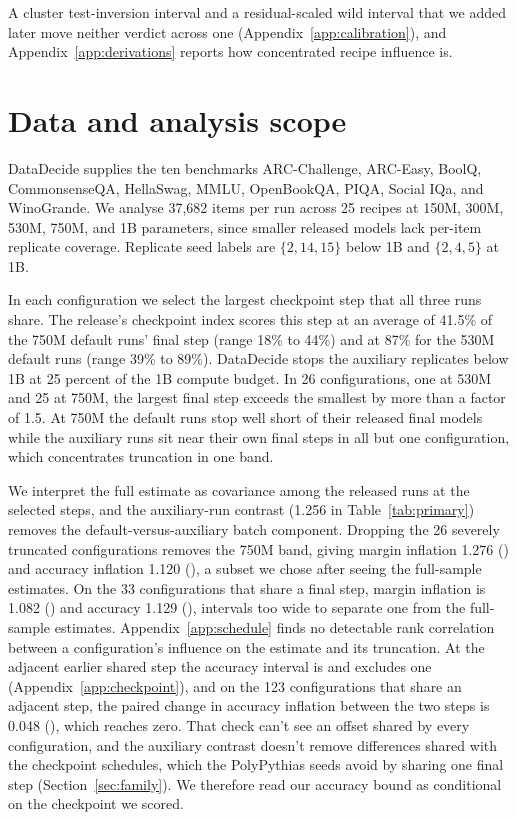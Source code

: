 A cluster test-inversion interval and a residual-scaled wild interval that we added later move neither verdict across one (Appendix~\ref{app:calibration}), and Appendix~\ref{app:derivations} reports how concentrated recipe influence is.

\section{Data and analysis scope}
\label{sec:data}
DataDecide supplies the ten benchmarks ARC-Challenge, ARC-Easy, BoolQ, CommonsenseQA, HellaSwag, MMLU, OpenBookQA, PIQA, Social IQa, and WinoGrande. We analyse 37,682 items per run across 25 recipes at 150M, 300M, 530M, 750M, and 1B parameters, since smaller released models lack per-item replicate coverage. Replicate seed labels are $\{2,14,15\}$ below 1B and $\{2,4,5\}$ at 1B.

In each configuration we select the largest checkpoint step that all three runs share. The release's checkpoint index scores this step at an average of 41.5\% of the 750M default runs' final step (range 18\% to 44\%) and at 87\% for the 530M default runs (range 39\% to 89\%). DataDecide stops the auxiliary replicates below 1B at 25 percent of the 1B compute budget. In 26 configurations, one at 530M and 25 at 750M, the largest final step exceeds the smallest by more than a factor of 1.5. At 750M the default runs stop well short of their released final models while the auxiliary runs sit near their own final steps in all but one configuration, which concentrates truncation in one band.

We interpret the full estimate as covariance among the released runs at the selected steps, and the auxiliary-run contrast (1.256 in Table~\ref{tab:primary}) removes the default-versus-auxiliary batch component. Dropping the 26 severely truncated configurations removes the 750M band, giving margin inflation 1.276 () and accuracy inflation 1.120 (), a subset we chose after seeing the full-sample estimates. On the 33 configurations that share a final step, margin inflation is 1.082 () and accuracy 1.129 (), intervals too wide to separate one from the full-sample estimates. Appendix~\ref{app:schedule} finds no detectable rank correlation between a configuration's influence on the estimate and its truncation. At the adjacent earlier shared step the accuracy interval is  and excludes one (Appendix~\ref{app:checkpoint}), and on the 123 configurations that share an adjacent step, the paired change in accuracy inflation between the two steps is 0.048 (), which reaches zero. That check can't see an offset shared by every configuration, and the auxiliary contrast doesn't remove differences shared with the checkpoint schedules, which the PolyPythias seeds avoid by sharing one final step (Section~\ref{sec:family}). We therefore read our accuracy bound as conditional on the checkpoint we scored.

